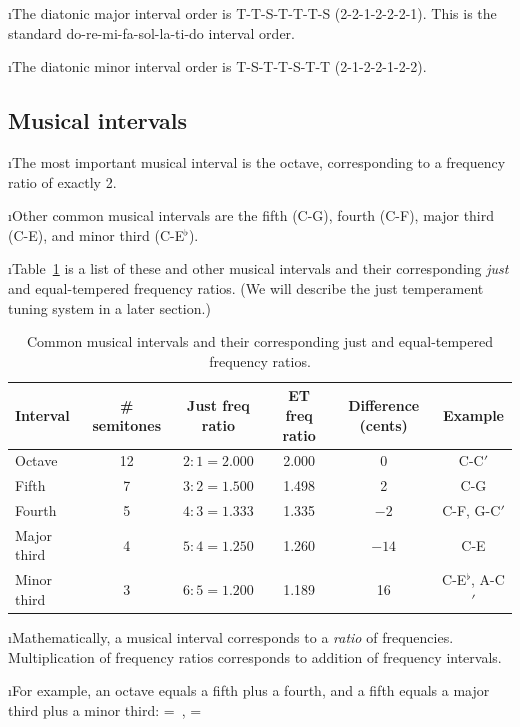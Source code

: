 \i The diatonic major interval order is 
T-T-S-T-T-T-S (2-2-1-2-2-2-1).
This is the standard
%
\be
{\rm do-re-mi-fa-sol-la-ti-do}
\nonumber
\ee
%
interval order.

\i The diatonic minor interval order is
T-S-T-T-S-T-T (2-1-2-2-1-2-2).

\ei
\subsection{Musical intervals}
\bi

\i The most important musical interval is the
octave, corresponding to a frequency ratio of 
exactly 2.

\i Other common musical intervals are the 
fifth (C-G), 
fourth (C-F),
major third (C-E), and
minor third (C-E$^\flat$).

\i Table~\ref{t:musical-intervals} is a list of 
these and other musical intervals and their 
corresponding {\em just} and equal-tempered frequency ratios.
(We will describe the just temperament tuning system
in a later section.)

\begin{table}[htbp]
\begin{center}
\begin{tabular}{|l|c|c|c|c|c|}
\hline
Interval & \# semitones & Just freq ratio &
ET freq ratio & Difference (cents) & Example \\
\hline
Octave & 12 & $2:1=2.000$ & 2.000 & 0 & C-C$'$ \\
Fifth & 7 & $3:2=1.500$ & 1.498 & 2 & C-G \\
Fourth & 5 & $4:3=1.333$ & 1.335 & $-2$ & C-F, G-C$'$ \\
Major third & 4 & $5:4=1.250$ & 1.260 & $-14$ & C-E \\
Minor third & 3 & $6:5=1.200$ & 1.189 & 16 & C-E${}^\flat$, A-C$'$ \\
\hline
\end{tabular}
\caption{Common musical intervals and their corresponding
just and equal-tempered frequency ratios.}
\label{t:musical-intervals}
\end{center}
\end{table}

\i Mathematically, a musical interval corresponds to a 
{\em ratio} of frequencies.
Multiplication of frequency ratios corresponds
to addition of frequency intervals.

\i For example,
an octave equals a fifth plus a fourth,
and a fifth equals a major third plus a minor third:
%
\be
{}\cdot {} = \,,
\qquad
{}\cdot {} = 
\ee
%

